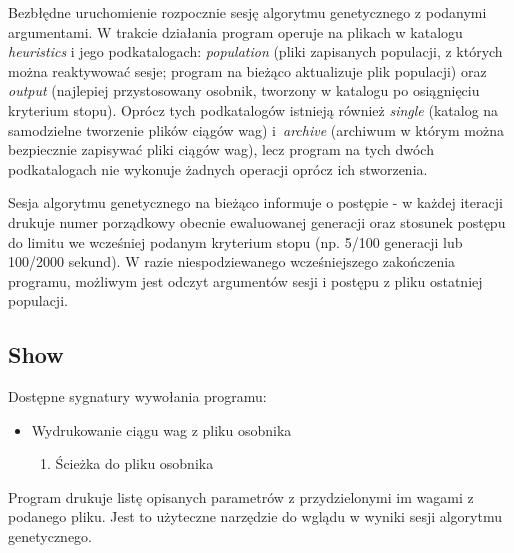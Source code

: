 Bezbłędne uruchomienie rozpocznie sesję algorytmu genetycznego z podanymi argumentami. W trakcie działania program operuje na plikach w katalogu \textit{heuristics} i jego podkatalogach: \textit{population} (pliki zapisanych populacji, z których można reaktywować sesje; program na bieżąco aktualizuje plik populacji) oraz \textit{output} (najlepiej przystosowany osobnik, tworzony w katalogu po osiągnięciu kryterium stopu). Oprócz tych podkatalogów istnieją również \textit{single} (katalog na samodzielne tworzenie plików ciągów wag) i~\textit{archive} (archiwum w którym można bezpiecznie zapisywać pliki ciągów wag), lecz program na tych dwóch podkatalogach nie wykonuje żadnych operacji oprócz ich stworzenia.

Sesja algorytmu genetycznego na bieżąco informuje o postępie - w każdej iteracji drukuje numer porządkowy obecnie ewaluowanej generacji oraz stosunek postępu do limitu we wcześniej podanym kryterium stopu (np. 5/100 generacji lub 100/2000 sekund). W razie niespodziewanego wcześniejszego zakończenia programu, możliwym jest odczyt argumentów sesji i postępu z pliku ostatniej populacji.

\subsection{Show}

Dostępne sygnatury wywołania programu:
\begin{itemize}
    \item Wydrukowanie ciągu wag z pliku osobnika
    \begin{enumerate}
        \item Ścieżka do pliku osobnika
    \end{enumerate}
\end{itemize}

Program drukuje listę opisanych parametrów z przydzielonymi im wagami z podanego pliku. Jest to użyteczne narzędzie do wglądu w wyniki sesji algorytmu genetycznego.

